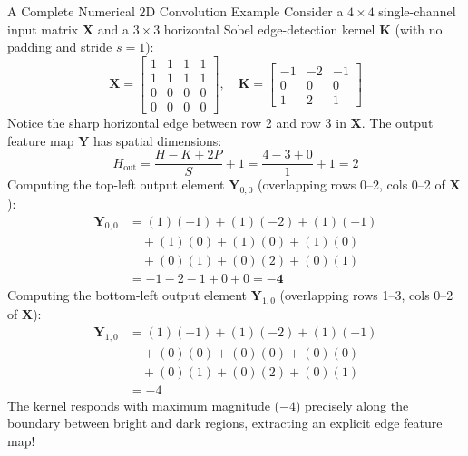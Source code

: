 \begin{mathbox}{A Complete Numerical $2\text{D}$ Convolution Example}
Consider a $4 \times 4$ single-channel input matrix $\mathbf{X}$ and a $3 \times 3$ horizontal Sobel edge-detection kernel $\mathbf{K}$ (with no padding and stride $s=1$):
\[
\mathbf{X} = \begin{bmatrix}
1 & 1 & 1 & 1 \\
1 & 1 & 1 & 1 \\
0 & 0 & 0 & 0 \\
0 & 0 & 0 & 0
\end{bmatrix}, \quad
\mathbf{K} = \begin{bmatrix}
-1 & -2 & -1 \\
 0 &  0 &  0 \\
 1 &  2 &  1
\end{bmatrix}
\]
Notice the sharp horizontal edge between row 2 and row 3 in $\mathbf{X}$.
The output feature map $\mathbf{Y}$ has spatial dimensions:
\[
H_{\text{out}} = \frac{H - K + 2P}{S} + 1 = \frac{4 - 3 + 0}{1} + 1 = 2
\]
Computing the top-left output element $\mathbf{Y}_{0,0}$ (overlapping rows 0--2, cols 0--2 of $\mathbf{X}$):
\begin{align*}
\mathbf{Y}_{0,0} &= (1)(-1) + (1)(-2) + (1)(-1) \\
                 &\quad + (1)(0) + (1)(0) + (1)(0) \\
                 &\quad + (0)(1) + (0)(2) + (0)(1) \\
                 &= -1 - 2 - 1 + 0 + 0 = \mathbf{-4}
\end{align*}
Computing the bottom-left output element $\mathbf{Y}_{1,0}$ (overlapping rows 1--3, cols 0--2 of $\mathbf{X}$):
\begin{align*}
\mathbf{Y}_{1,0} &= (1)(-1) + (1)(-2) + (1)(-1) \\
                 &\quad + (0)(0) + (0)(0) + (0)(0) \\
                 &\quad + (0)(1) + (0)(2) + (0)(1) \\
                 &= -4
\end{align*}
The kernel responds with maximum magnitude ($-4$) precisely along the boundary between bright and dark regions, extracting an explicit edge feature map!
\end{mathbox}

